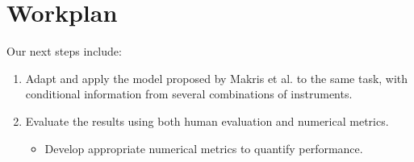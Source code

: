 \section{Workplan}

Our next steps include:
\begin{enumerate}
    \item Adapt and apply the model proposed by Makris et al. to the same task, with conditional information from several combinations of instruments.
    \item Evaluate the results using both human evaluation and numerical metrics. 
    \begin{itemize}
        \item Develop appropriate numerical metrics to quantify performance.
    \end{itemize}
\end{enumerate}